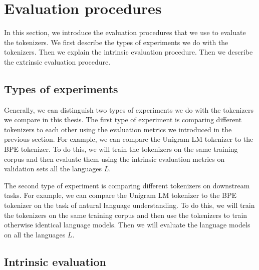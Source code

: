 


\section{Evaluation procedures}

In this section, we introduce the evaluation procedures that we use to evaluate the tokenizers. We first describe the types of experiments we do with the tokenizers. Then we explain the intrinsic evaluation procedure. Then we describe the extrinsic evaluation procedure.

\subsection{Types of experiments}

Generally, we can distinguish two types of experiments we do with the tokenizers we compare in this thesis. The first type of experiment is comparing different tokenizers to each other using the evaluation metrics we introduced in the previous section. For example, we can compare the Unigram LM tokenizer to the BPE tokenizer. To do this, we will train the tokenizers on the same training corpus and then evaluate them using the intrinsic evaluation metrics on validation sets  all the languages $L$. 

The second type of experiment is comparing different tokenizers on downstream tasks. For example, we can compare the Unigram LM tokenizer to the BPE tokenizer on the task of natural language understanding. To do this, we will train the tokenizers on the same training corpus and then use the tokenizers to train otherwise identical language models. Then we will evaluate the language models on  all the languages $L$. 

\subsection{Intrinsic evaluation}
\label{sec:intrinsic_evaluation}

